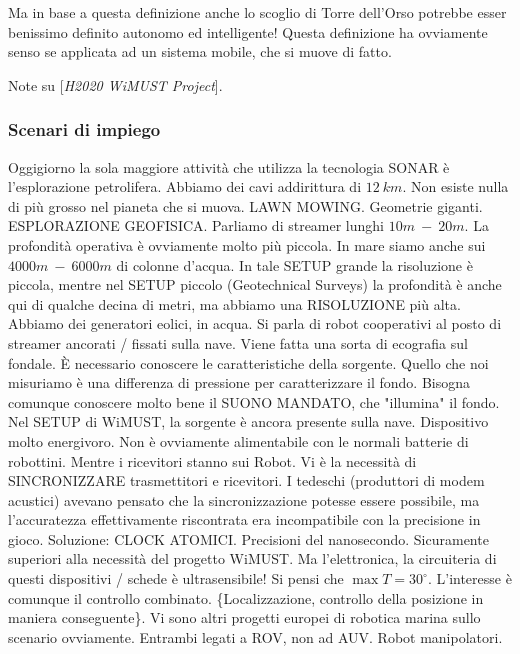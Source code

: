 Ma in base a questa definizione anche lo scoglio di Torre dell'Orso potrebbe esser benissimo definito autonomo ed intelligente! Questa definizione ha ovviamente senso se applicata ad un sistema mobile, che si muove di fatto.

Note su [\emph{H2020 WiMUST Project}].

\subsubsection{Scenari di impiego}

Oggigiorno la sola maggiore attività che utilizza la tecnologia SONAR è l'esplorazione petrolifera. Abbiamo dei cavi addirittura di $12\ km$. Non esiste nulla di più grosso nel pianeta che si muova. LAWN MOWING. Geometrie giganti. ESPLORAZIONE GEOFISICA. Parliamo di streamer lunghi $10m\ -\ 20m$. La profondità operativa è ovviamente molto più piccola. In mare siamo anche sui $4000m\ -\ 6000m$ di colonne d'acqua. In tale SETUP grande la risoluzione è piccola, mentre nel SETUP piccolo (Geotechnical Surveys) la profondità è anche qui di qualche decina di metri, ma abbiamo una RISOLUZIONE più alta. Abbiamo dei generatori eolici, in acqua. Si parla di robot cooperativi al posto di streamer ancorati / fissati sulla nave. Viene fatta una sorta di ecografia sul fondale. \`E necessario conoscere le caratteristiche della sorgente. Quello che noi misuriamo è una differenza di pressione per caratterizzare il fondo. Bisogna comunque conoscere molto bene il SUONO MANDATO, che "illumina" il fondo. Nel SETUP di WiMUST, la sorgente è ancora presente sulla nave. Dispositivo molto energivoro. Non è ovviamente alimentabile con le normali batterie di robottini. Mentre i ricevitori stanno sui Robot. Vi è la necessità di SINCRONIZZARE trasmettitori e ricevitori. I tedeschi (produttori di modem acustici) avevano pensato che la sincronizzazione potesse essere possibile, ma l'accuratezza effettivamente riscontrata era incompatibile con la precisione in gioco. Soluzione: CLOCK ATOMICI. Precisioni del nanosecondo. Sicuramente superiori alla necessità del progetto WiMUST. Ma l'elettronica, la circuiteria di questi dispositivi / schede è ultrasensibile! Si pensi che $\max{T} = 30^{\circ}$. L'interesse è comunque il controllo combinato. \{Localizzazione, controllo della posizione in maniera conseguente\}. Vi sono altri progetti europei di robotica marina sullo scenario ovviamente. Entrambi legati a ROV, non ad AUV. Robot manipolatori.

